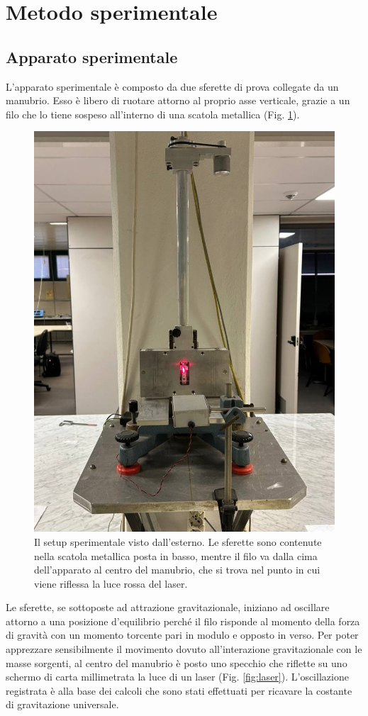 \documentclass{article}
\begin{document}
\section{Metodo sperimentale}
\subsection{Apparato sperimentale}\label{section:setup}
L'apparato sperimentale è composto da due sferette di prova collegate da un manubrio. Esso è libero di ruotare attorno al proprio asse verticale, grazie a un filo che lo tiene sospeso all'interno di una scatola metallica (Fig. \ref{fig:setup}).

\begin{figure}[ht!]
    \centering
    \includegraphics[width=0.3\linewidth]{images/setup.jpg}
    \caption{Il setup sperimentale visto dall'esterno. Le sferette sono contenute nella scatola metallica posta in basso, mentre il filo va dalla cima dell'apparato al centro del manubrio, che si trova nel punto in cui viene riflessa la luce rossa del laser.}
    \label{fig:setup}
\end{figure}

Le sferette, se sottoposte ad attrazione gravitazionale, iniziano ad oscillare attorno a una posizione d'equilibrio perché il filo risponde al momento della forza di gravità con un momento torcente pari in modulo e opposto in verso.
Per poter apprezzare sensibilmente il movimento dovuto all'interazione gravitazionale con le masse sorgenti, al centro del manubrio è posto uno specchio che riflette su uno schermo di carta millimetrata la luce di un laser (Fig. \ref{fig:laser}). L'oscillazione registrata è alla base dei calcoli che sono stati effettuati per ricavare la costante di gravitazione universale.
\end{document}
